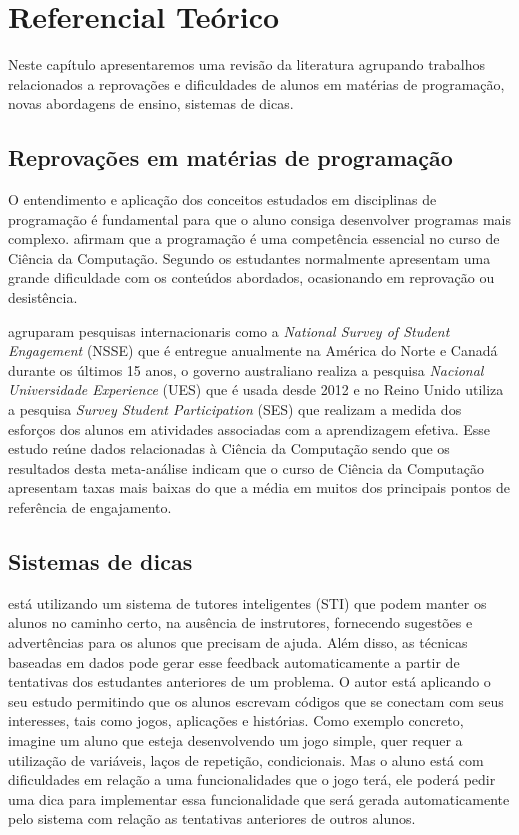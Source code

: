 \chapter{Referencial Teórico}

Neste capítulo apresentaremos uma revisão da literatura agrupando trabalhos relacionados a reprovações e dificuldades de alunos em matérias de programação, novas abordagens de ensino, sistemas de dicas. 

\section{Reprovações em matérias de programação}

O entendimento e aplicação dos conceitos estudados em disciplinas de programação é fundamental para que o aluno consiga desenvolver programas mais complexo.  afirmam que a programação é uma competência essencial no curso de Ciência da Computação. Segundo  os estudantes normalmente apresentam uma grande dificuldade com os conteúdos abordados, ocasionando em reprovação ou desistência.

 agruparam pesquisas internacionaris como a \textit{National Survey of Student Engagement} (NSSE) que é entregue anualmente na América do Norte e Canadá durante os últimos 15 anos, o governo australiano realiza a pesquisa \textit{Nacional Universidade Experience} (UES) que é usada desde 2012 e no Reino Unido utiliza a pesquisa \textit{Survey Student Participation} (SES) que realizam a medida dos esforços dos alunos em atividades associadas com a aprendizagem efetiva. Esse estudo reúne dados relacionadas à Ciência da Computação sendo que os resultados desta meta-análise indicam que o curso de Ciência da Computação apresentam taxas mais baixas do que a média em muitos dos principais pontos de referência de engajamento.

\section{Sistemas de dicas}

 está utilizando um sistema de tutores inteligentes (STI) que podem manter os alunos no caminho certo, na ausência de instrutores, fornecendo sugestões e advertências para os alunos que precisam de ajuda. Além disso, as técnicas baseadas em dados pode gerar esse feedback automaticamente a partir de tentativas dos estudantes anteriores de um problema. O autor está aplicando o seu estudo permitindo que os alunos escrevam códigos que se conectam com seus interesses, tais como jogos, aplicações e histórias. Como exemplo concreto, imagine um aluno que esteja desenvolvendo um jogo simple, quer requer a utilização de variáveis, laços de repetição, condicionais. Mas o aluno está com dificuldades em relação a uma funcionalidades que o jogo terá, ele poderá pedir uma dica para implementar essa funcionalidade que será gerada automaticamente pelo sistema com relação as tentativas anteriores de outros alunos.

